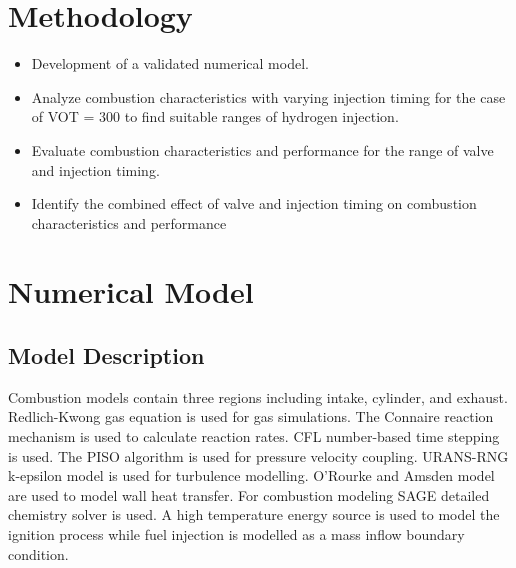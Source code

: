 \documentclass[conference]{IEEEtran}
\begin{document}
\section{Methodology}
\begin{itemize}
    \item Development of a validated numerical model.
    \item Analyze combustion characteristics with varying injection timing for the case of VOT = 300 to find suitable ranges of hydrogen injection.
    \item Evaluate combustion characteristics and performance for the range of valve and injection timing.
    \item Identify the combined effect of valve and injection timing on combustion characteristics and performance
\end{itemize}


\section{Numerical Model}
\subsection{Model Description}
Combustion models contain three regions including intake, cylinder, and exhaust. Redlich-Kwong gas equation is used for gas simulations. The Connaire reaction mechanism is used to calculate reaction rates. CFL number-based time stepping is used. The PISO algorithm is used for pressure velocity coupling. URANS-RNG k-epsilon model is used for turbulence modelling. O’Rourke and Amsden model are used to model wall heat transfer. For combustion modeling SAGE detailed chemistry solver is used. A high temperature energy source is used to model the ignition process while fuel injection is modelled as a mass inflow boundary condition.
\end{document}
